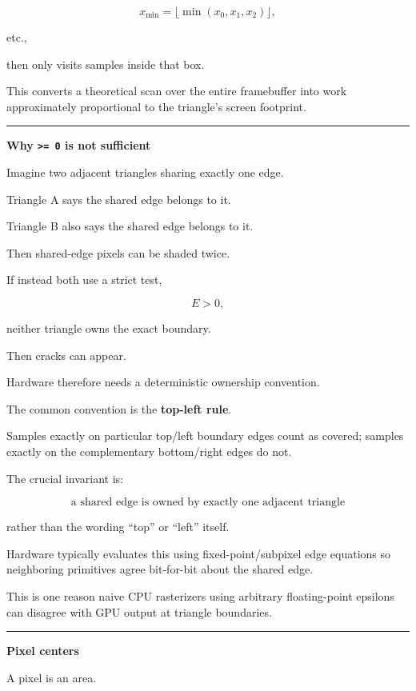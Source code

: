 \[
x_{\min}=
\lfloor\min(x_0,x_1,x_2)\rfloor,
\]

etc.,

then only visits samples inside that box.

This converts a theoretical scan over the entire framebuffer into work approximately proportional to the triangle's screen footprint.

\begin{center}\rule{0.5\linewidth}{0.5pt}\end{center}

\textbf{Why \texttt{\textgreater{}=\ 0} is not sufficient}

Imagine two adjacent triangles sharing exactly one edge.

Triangle A says the shared edge belongs to it.

Triangle B also says the shared edge belongs to it.

Then shared-edge pixels can be shaded twice.

If instead both use a strict test,

\[
E>0,
\]

neither triangle owns the exact boundary.

Then cracks can appear.

Hardware therefore needs a deterministic ownership convention.

The common convention is the \textbf{top-left rule}.

Samples exactly on particular top/left boundary edges count as covered; samples exactly on the complementary bottom/right edges do not.

The crucial invariant is:

\[
\boxed{
\text{a shared edge is owned by exactly one adjacent triangle}
}
\]

rather than the wording ``top'' or ``left'' itself.

Hardware typically evaluates this using fixed-point/subpixel edge equations so neighboring primitives agree bit-for-bit about the shared edge.

This is one reason naive CPU rasterizers using arbitrary floating-point epsilons can disagree with GPU output at triangle boundaries.

\begin{center}\rule{0.5\linewidth}{0.5pt}\end{center}

\textbf{Pixel centers}

A pixel is an area.

